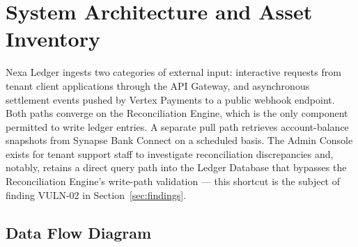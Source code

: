 \section{System Architecture and Asset Inventory}
\label{sec:architecture}

Nexa Ledger ingests two categories of external input: interactive requests from tenant client applications through the API Gateway, and asynchronous settlement events pushed by Vertex Payments to a public webhook endpoint. Both paths converge on the Reconciliation Engine, which is the only component permitted to write ledger entries. A separate pull path retrieves account-balance snapshots from Synapse Bank Connect on a scheduled basis. The Admin Console exists for tenant support staff to investigate reconciliation discrepancies and, notably, retains a direct query path into the Ledger Database that bypasses the Reconciliation Engine's write-path validation --- this shortcut is the subject of finding VULN-02 in Section~\ref{sec:findings}.

\subsection{Data Flow Diagram}

